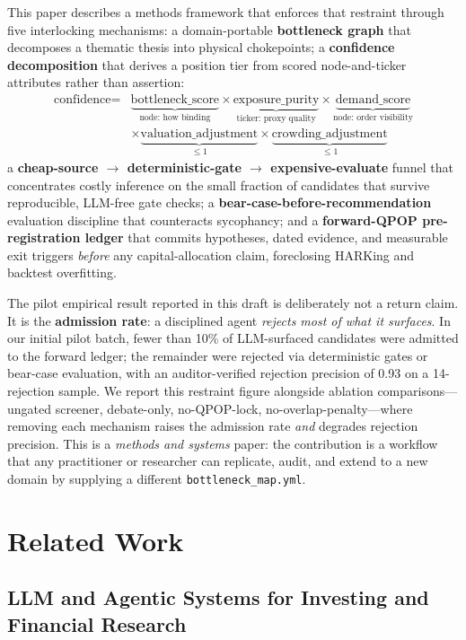 \documentclass[11pt]{article}
\begin{document}
This paper describes a methods framework that enforces that restraint through five
interlocking mechanisms: a domain-portable \textbf{bottleneck graph} that decomposes
a thematic thesis into physical chokepoints; a \textbf{confidence decomposition} that
derives a position tier from scored node-and-ticker attributes rather than assertion:
%
\[
  \begin{aligned}
  \text{confidence} = {}&\underbrace{\text{bottleneck\_score}}_{\text{node: how binding}}
    \times \underbrace{\text{exposure\_purity}}_{\text{ticker: proxy quality}}
    \times \underbrace{\text{demand\_score}}_{\text{node: order visibility}} \\
    &\times \underbrace{\text{valuation\_adjustment}}_{\leq 1}
    \times \underbrace{\text{crowding\_adjustment}}_{\leq 1}
  \end{aligned}
\]
%
a \textbf{cheap-source $\to$ deterministic-gate $\to$ expensive-evaluate} funnel that
concentrates costly inference on the small fraction of candidates that survive
reproducible, LLM-free gate checks; a \textbf{bear-case-before-recommendation} evaluation
discipline that counteracts sycophancy; and a \textbf{forward-QPOP pre-registration ledger}
that commits hypotheses, dated evidence, and measurable exit triggers \emph{before} any
capital-allocation claim, foreclosing HARKing and backtest overfitting.

The pilot empirical result reported in this draft is deliberately not a return claim.
It is the \textbf{admission rate}: a disciplined agent \emph{rejects most of what it
surfaces}.
In our initial pilot batch, fewer than 10\% of LLM-surfaced candidates were admitted to the
forward ledger; the remainder were rejected via deterministic gates or bear-case evaluation,
with an auditor-verified rejection precision of 0.93 on a 14-rejection sample.
We report this restraint figure alongside ablation comparisons---ungated screener,
debate-only, no-\textsc{QPOP}-lock, no-overlap-penalty---where removing each mechanism
raises the admission rate \emph{and} degrades rejection precision.
This is a \emph{methods and systems} paper: the contribution is a workflow that any
practitioner or researcher can replicate, audit, and extend to a new domain by supplying
a different \texttt{bottleneck\_map.yml}.

\section{Related Work}

\subsection{LLM and Agentic Systems for Investing and Financial Research}
\end{document}
